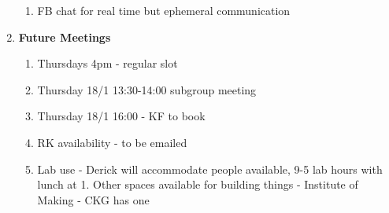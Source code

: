 \begin{enumerate}
\begin{enumerate}
\item  FB chat for real time but ephemeral communication\\
\end{enumerate}

\item  \textbf{Future Meetings}

\begin{enumerate}
\item \textbf{ }Thursdays 4pm - regular slot

\item  Thursday 18/1 13:30-14:00 subgroup meeting

\item  Thursday 18/1 16:00 - KF to book

\item  RK availability - to be emailed

\item  Lab use - Derick will accommodate people available, 9-5 lab hours with lunch at 1. Other spaces available for building things - Institute of Making - CKG has one
\end{enumerate}
\end{enumerate}


